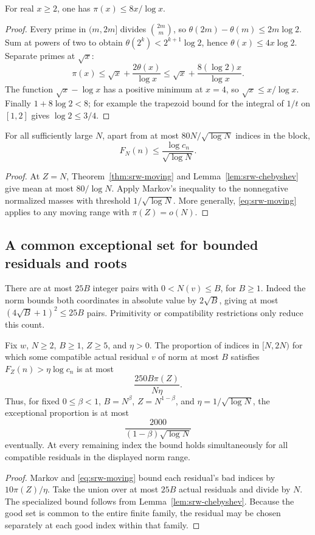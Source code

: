 \begin{lemma}\label{lem:srw-chebyshev}
For real $x\ge2$, one has $\pi(x)\le8x/\log x$.
\end{lemma}
\begin{proof}
Every prime in $(m,2m]$ divides $\binom{2m}{m}$, so
$\theta(2m)-\theta(m)\le2m\log2$. Sum at powers of two to obtain
$\theta(2^k)<2^{k+1}\log2$, hence $\theta(x)\le4x\log2$.
Separate primes at $\sqrt x$:
\[
 \pi(x)\le\sqrt x+\frac{2\theta(x)}{\log x}
 \le\sqrt x+\frac{8(\log2)x}{\log x}.
\]
The function $\sqrt x-\log x$ has a positive minimum at $x=4$, so
$\sqrt x\le x/\log x$. Finally $1+8\log2<8$; for example the trapezoid
bound for the integral of $1/t$ on $[1,2]$ gives $\log2\le3/4$.
\end{proof}

\begin{corollary}
\label{cor:srw-linear}
For all sufficiently large $N$, apart from at most
$80N/\sqrt{\log N}$ indices in the block,
\[
 F_N(n)\le\frac{\log c_n}{\sqrt{\log N}}.
\]
\end{corollary}
\begin{proof}
At $Z=N$, Theorem~\ref{thm:srw-moving} and
Lemma~\ref{lem:srw-chebyshev} give mean at most $80/\log N$. Apply Markov's
inequality to the nonnegative normalized masses with threshold
$1/\sqrt{\log N}$. More generally, \eqref{eq:srw-moving} applies to any
moving range with $\pi(Z)=o(N)$.
\end{proof}

\subsection{A common exceptional set for bounded residuals and roots}
There are at most $25B$ integer pairs with $0<N(v)\le B$, for $B\ge1$.
Indeed the norm bounds both coordinates in absolute value by $2\sqrt B$,
giving at most $(4\sqrt B+1)^2\le25B$ pairs. Primitivity or compatibility
restrictions only reduce this count.

\begin{theorem}\label{thm:srw-residuals}
Fix $w$, $N\ge2$, $B\ge1$, $Z\ge5$, and $\eta>0$. The proportion of
indices in $[N,2N)$ for which some compatible actual residual $v$ of norm at
most $B$ satisfies $F_Z(n)>\eta\log c_n$ is at most
\[
 \frac{250B\pi(Z)}{N\eta}.
\]
Thus, for fixed $0\le\beta<1$, $B=N^\beta$, $Z=N^{1-\beta}$, and
$\eta=1/\sqrt{\log N}$, the exceptional proportion is at most
\[
 \frac{2000}{(1-\beta)\sqrt{\log N}}
\]
eventually. At every remaining index the bound holds simultaneously for all
compatible residuals in the displayed norm range.
\end{theorem}
\begin{proof}
Markov and \eqref{eq:srw-moving} bound each residual's bad indices by
$10\pi(Z)/\eta$. Take the union over at most $25B$ actual residuals and
divide by $N$. The specialized bound follows from
Lemma~\ref{lem:srw-chebyshev}. Because the good set is common to the entire
finite family, the residual may be chosen separately at each good index within
that family.
\end{proof}

